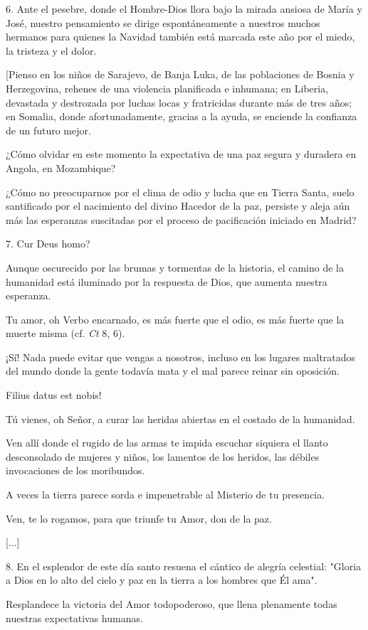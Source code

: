 6. Ante el pesebre, donde el Hombre-Dios llora bajo la mirada ansiosa de
María y José, nuestro pensamiento se dirige espontáneamente a nuestros
muchos hermanos para quienes la Navidad también está marcada este año
por el miedo, la tristeza y el dolor.

{[}Pienso en los niños de Sarajevo, de Banja Luka, de las poblaciones de
Bosnia y Herzegovina, rehenes de una violencia planificada e inhumana;
en Liberia, devastada y destrozada por luchas locas y fratricidas
durante más de tres años; en Somalia, donde afortunadamente, gracias a
la ayuda, se enciende la confianza de un futuro mejor.

¿Cómo olvidar en este momento la expectativa de una paz segura y
duradera en Angola, en Mozambique?

¿Cómo no preocuparnos por el clima de odio y lucha que en Tierra Santa,
suelo santificado por el nacimiento del divino Hacedor de la paz,
persiste y aleja aún más las esperanzas suscitadas por el proceso de
pacificación iniciado en Madrid?

7. Cur Deus homo?

Aunque oscurecido por las brumas y tormentas de la historia, el camino
de la humanidad está iluminado por la respuesta de Dios, que aumenta
nuestra esperanza.

Tu amor, oh Verbo encarnado, es más fuerte que el odio, es más fuerte
que la muerte misma (cf. \emph{Ct} 8, 6).

¡Sí! Nada puede evitar que vengas a nosotros, incluso en los lugares
maltratados del mundo donde la gente todavía mata y el mal parece reinar
sin oposición.

Filius datus est nobis!

Tú vienes, oh Señor, a curar las heridas abiertas en el costado de la
humanidad.

Ven allí donde el rugido de las armas te impida escuchar siquiera el
llanto desconsolado de mujeres y niños, los lamentos de los heridos, las
débiles invocaciones de los moribundos.

A veces la tierra parece sorda e impenetrable al Misterio de tu
presencia.

Ven, te lo rogamos, para que triunfe tu Amor, don de la paz.

{[}...{]}

8. En el esplendor de este día santo resuena el cántico de alegría
celestial: "Gloria a Dios en lo alto del cielo y paz en la tierra a los
hombres que Él ama".

Resplandece la victoria del Amor todopoderoso, que llena plenamente
todas nuestras expectativas humanas.


